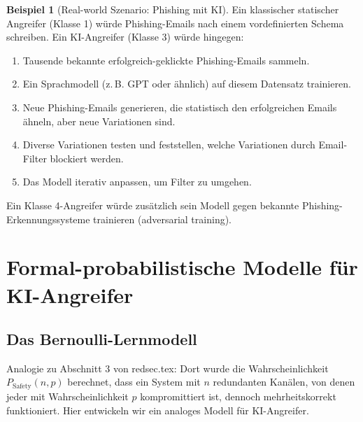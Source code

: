 \documentclass[a4paper,12pt]{article}
\theoremstyle{definition}
\newtheorem{beispiel}{Beispiel}
\begin{document}
\begin{beispiel}[Real-world Szenario: Phishing mit KI]
Ein klassischer statischer Angreifer (Klasse 1) würde Phishing-Emails nach einem vordefinierten Schema schreiben. Ein KI-Angreifer (Klasse 3) würde hingegen:
\begin{enumerate}
	\item Tausende bekannte erfolgreich-geklickte Phishing-Emails sammeln.
	\item Ein Sprachmodell (z.\,B. GPT oder ähnlich) auf diesem Datensatz trainieren.
	\item Neue Phishing-Emails generieren, die statistisch den erfolgreichen Emails ähneln, aber neue Variationen sind.
	\item Diverse Variationen testen und feststellen, welche Variationen durch Email-Filter blockiert werden.
	\item Das Modell iterativ anpassen, um Filter zu umgehen.
\end{enumerate}

Ein Klasse 4-Angreifer würde zusätzlich sein Modell gegen bekannte Phishing-Erkennungssysteme trainieren (adversarial training).
\end{beispiel}

\section{Formal-probabilistische Modelle für KI-Angreifer}

\subsection{Das Bernoulli-Lernmodell}

Analogie zu Abschnitt 3 von redsec.tex: Dort wurde die Wahrscheinlichkeit $P_{\mathrm{Safety}}(n,p)$ berechnet, dass ein System mit $n$ redundanten Kanälen, von denen jeder mit Wahrscheinlichkeit $p$ kompromittiert ist, dennoch mehrheitskorrekt funktioniert. Hier entwickeln wir ein analoges Modell für KI-Angreifer.
\end{document}
